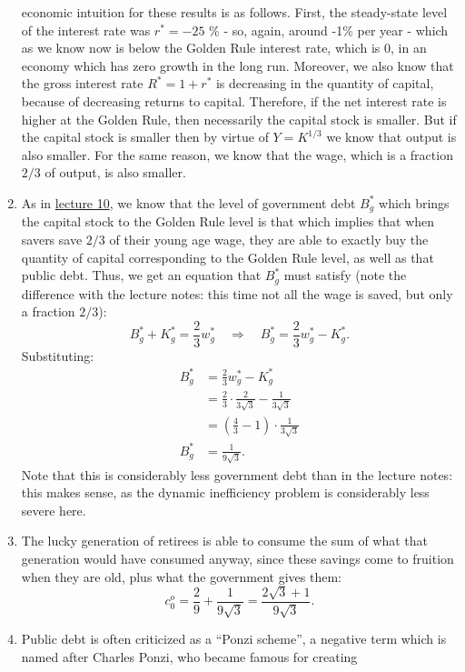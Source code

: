 \documentclass[]{book}
\begin{document}
\begin{enumerate}
  economic intuition for these results is as follows. First, the
  steady-state level of the interest rate was \(r^{*}=-25\) \% - so,
  again, around -1\% per year - which as we know now is below the Golden
  Rule interest rate, which is 0, in an economy which has zero growth in
  the long run. Moreover, we also know that the gross interest rate
  \(R^{*}=1+r^{*}\) is decreasing in the quantity of capital, because of
  decreasing returns to capital. Therefore, if the net interest rate is
  higher at the Golden Rule, then necessarily the capital stock is
  smaller. But if the capital stock is smaller then by virtue of
  \(Y=K^{1/3}\) we know that output is also smaller. For the same
  reason, we know that the wage, which is a fraction \(2/3\) of output,
  is also smaller.
\item
  As in \protect\hyperlink{public-debt}{lecture 10}, we know that the
  level of government debt \(B^{*}_g\) which brings the capital stock to
  the Golden Rule level is that which implies that when savers save
  \(2/3\) of their young age wage, they are able to exactly buy the
  quantity of capital corresponding to the Golden Rule level, as well as
  that public debt. Thus, we get an equation that \(B^{*}_g\) must
  satisfy (note the difference with the lecture notes: this time not all
  the wage is saved, but only a fraction \(2/3\)):
  \[B^{*}_g+K^{*}_g=\frac{2}{3}w^{*}_g\quad\Rightarrow\quad B^{*}_g=\frac{2}{3}w^{*}_g-K^{*}_g.\]
  Substituting: \[
  \begin{aligned}
  B^{*}_g&=\frac{2}{3}w^{*}_g-K^{*}_g\\
  &=\frac{2}{3} \cdot \frac{2}{3\sqrt{3}}-\frac{1}{3\sqrt{3}}\\
  &=\left(\frac{4}{3}-1\right) \cdot \frac{1}{3\sqrt{3}}\\
  B^{*}_g&=\frac{1}{9\sqrt{3}}.
  \end{aligned}
  \] Note that this is considerably less government debt than in the
  lecture notes: this makes sense, as the dynamic inefficiency problem
  is considerably less severe here.
\item
  The lucky generation of retirees is able to consume the sum of what
  that generation would have consumed anyway, since these savings come
  to fruition when they are old, plus what the government gives them:
  \[c_{0}^{o}=\frac{2}{9}+\frac{1}{9\sqrt{3}}=\frac{2\sqrt{3}+1}{9\sqrt{3}}.\]
\item
  Public debt is often criticized as a ``Ponzi scheme'', a negative term
  which is named after Charles Ponzi, who became famous for creating

\end{enumerate}
\end{document}
